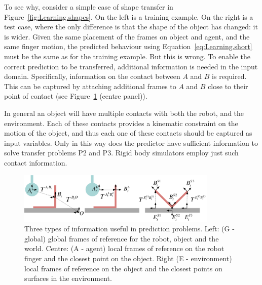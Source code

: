To see why, consider a simple case of shape transfer in Figure~\ref{fig:Learning.shapes}. On the left is a training example. On the right is a test case, where the only difference is that the shape of the object has changed: it is wider. Given the same placement of the frames on object and agent, and the same finger motion, the predicted behaviour using Equation~\eqref{eq:Learning.short} must be the same as for the training example. But this is wrong. To enable the correct prediction to be transferred, additional information is needed in the input domain. Specifically, information on the contact between $A$ and $B$ is required. This can be captured by attaching additional frames to $A$ and $B$ close to their point of contact (see Figure~\ref{fig:Learning.setup2} (centre panel)).

In general an object will have multiple contacts with both the robot, and the environment. Each of these contacts provides a kinematic constraint on the motion of the object, and thus each one of these contacts should be captured as input variables. Only in this way does the predictor have sufficient information to solve transfer problems P2 and P3. Rigid body simulators employ just such contact information. 


\begin{figure}[t]
\centerline{\includegraphics[width=0.85\textwidth]{information}}
\caption{Three types of information useful in prediction problems. Left: (G - global) global frames of reference for the robot, object and the world. Centre: (A - agent) local frames of reference on the robot finger and the closest point on the object. Right (E - environment) local frames of reference on the object and the closest points on surfaces in the environment.}
\label{fig:Learning.setup2}
\end{figure}

